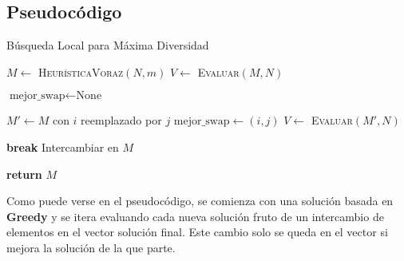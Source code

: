 \documentclass[12pt,letterpaper]{article}
\begin{document}
\subsection{Pseudocódigo}
\begin{algorithm}
    \caption{Búsqueda Local para Máxima Diversidad}
    \begin{algorithmic}[1]
    \State $M \gets$ \textsc{HeurísticaVoraz}$(N, m)$
    \State $V \gets$ \textsc{Evaluar}$(M, N)$
    
        \State $\text{mejor\_swap} \gets \text{None}$
        
            \State $M' \gets M$ con $i$ reemplazado por $j$
                \State $\text{mejor\_swap} \gets (i, j)$
                \State $V \gets$ \textsc{Evaluar}$(M', N)$
            \EndIf
        \EndFor
        
            \State \textbf{break}
        \Else
            \State Intercambiar en $M$
        \EndIf
    \EndFor

    \State \textbf{return} $M$
    \EndProcedure
    \end{algorithmic}
\end{algorithm}

Como puede verse en el pseudocódigo, se comienza con una solución basada en \textbf{Greedy} y se itera evaluando cada nueva solución fruto de un intercambio de elementos en el vector solución final. Este cambio solo se queda en el vector si mejora la solución de la que parte.
\end{document}
